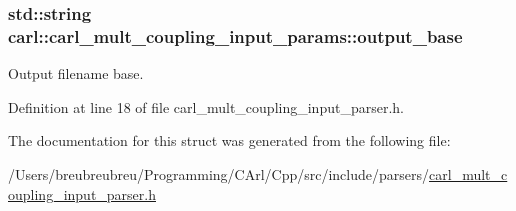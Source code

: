 \subsubsection[{output\+\_\+base}]{\setlength{\rightskip}{0pt plus 5cm}std\+::string carl\+::carl\+\_\+mult\+\_\+coupling\+\_\+input\+\_\+params\+::output\+\_\+base}\label{structcarl_1_1carl__mult__coupling__input__params_ae8b0746e5db705a3ece18ea951b8b9c4}


Output filename base. 



Definition at line 18 of file carl\+\_\+mult\+\_\+coupling\+\_\+input\+\_\+parser.\+h.



The documentation for this struct was generated from the following file\+:\begin{DoxyCompactItemize}
\item 
/\+Users/breubreubreu/\+Programming/\+C\+Arl/\+Cpp/src/include/parsers/\hyperlink{carl__mult__coupling__input__parser_8h}{carl\+\_\+mult\+\_\+coupling\+\_\+input\+\_\+parser.\+h}\end{DoxyCompactItemize}
